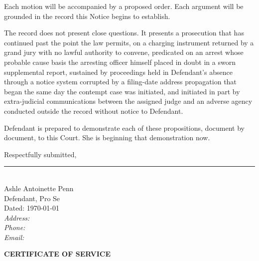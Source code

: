 \documentclass[12pt,letterpaper]{article}
\begin{document}
Each motion will be accompanied by a proposed order. Each argument will be
grounded in the record this Notice begins to establish.

The record does not present close questions. It presents a prosecution that has
continued past the point the law permits, on a charging instrument returned by
a grand jury with no lawful authority to convene, predicated on an arrest whose
probable cause basis the arresting officer himself placed in doubt in a sworn
supplemental report, sustained by proceedings held in Defendant's absence through
a notice system corrupted by a filing-date address propagation that began the
same day the contempt case was initiated, and initiated in part by extra-judicial
communications between the assigned judge and an adverse agency conducted outside
the record without notice to Defendant.

Defendant is prepared to demonstrate each of these propositions, document by
document, to this Court. She is beginning that demonstration now.


\vspace{24pt}
\noindent Respectfully submitted,

\vspace{48pt}
\noindent\rule{2.5in}{0.4pt}\\[4pt]
Ashle\textquotesingle{} Antoinette Penn\\
Defendant, Pro Se\\[6pt]
\noindent Dated: \today\\[6pt]
\textit{Address:} \underline{\hspace{2.5in}}\\[4pt]
\textit{Phone:} \underline{\hspace{2.5in}}\\[4pt]
\textit{Email:} \underline{\hspace{2.5in}}


\newpage

\begin{center}
\textbf{CERTIFICATE OF SERVICE}
\end{center}

\vspace{12pt}
\end{document}
